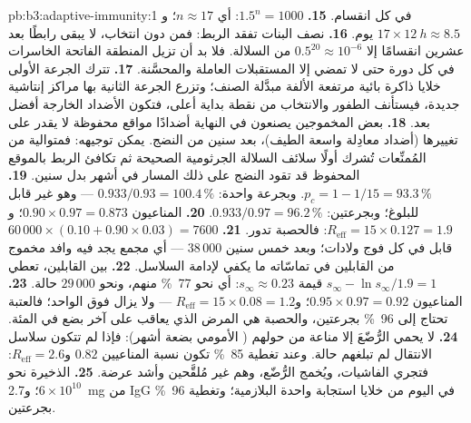 \begin{solution}{pb:b3:adaptive-immunity:1}
في كل انقسام.
\textbf{15.} $1.5^{n} = 1000$: أي $n \approx 17$؛ و$17\times \qty{12}{h}
\approx 8.5$ يوم.
\textbf{16.} نصف البنات تفقد الربط: فمن دون انتخاب، لا يبقى
رابطًا بعد عشرين انقسامًا إلا $0.5^{20}
\approx 10^{-6}$ من السلالة. فلا بد أن تزيل المنطقة الفاتحة
الخاسرات في كل دورة حتى لا تمضي إلا المستقبلات العاملة
والمحسَّنة.
\textbf{17.} تترك الجرعة الأولى خلايا ذاكرة بائية مرتفعة
الألفة مبدَّلة الصنف؛ وتزرع الجرعة الثانية بها مراكز
إنتاشية جديدة، فيستأنف الطفور والانتخاب من نقطة بداية أعلى،
فتكون الأضداد الخارجة أفضل بعد.
\textbf{18.} بعض المخموجين يصنعون في النهاية أضدادًا  مواقع
محفوظة لا يقدر  على تغييرها (أضداد معادِلة واسعة
الطيف)، بعد سنين من النضج.  يمكن توجيهه:
فمتوالية من المُمنِّعات تُشرك أولًا سلائف السلالة الجرثومية
الصحيحة ثم تكافئ الربط بالموقع المحفوظ قد تقود النضج على
ذلك المسار في أشهر بدل سنين.
\textbf{19.} $p_{c} = 1 - 1/15 = 93.3\,\%$. وبجرعة واحدة: $0.933/0.93 =
100.4\,\%$ --- وهو غير قابل للبلوغ؛ وبجرعتين: $0.933/0.97 = 96.2\,\%$.
\textbf{20.} المناعيون $0.90\times 0.97 = 0.873$؛ و$R_{\text{eff}} = 15\times
0.127 = 1.9$: فالحصبة تدور.
\textbf{21.} $60\,000\times (0.10 + 0.90\times 0.03) = 7600$ قابل في كل
فوج ولادات؛ وبعد خمس سنين $38\,000$ --- أي مجمع يجد فيه
وافد مخموج من القابلين في تماسّاته ما يكفي لإدامة السلاسل.
\textbf{22.} بين القابلين، تعطي $s_{\infty} - \ln s_{\infty}/1.9 =
1$ قيمة $s_{\infty} \approx 0.23$: أي نحو \qty{77}{\%} منهم، ونحو
$29\,000$ حالة.
\textbf{23.} المناعيون $0.95\times 0.97 = 0.92$؛ و$R_{\text{eff}} = 15\times
0.08 = 1.2$ --- ولا يزال فوق الواحد؛ فالعتبة تحتاج إلى
\qty{96}{\%} بجرعتين، والحصبة هي المرض الذي يعاقب على آخر بضع
في المئة.
\textbf{24.} لا يحمي الرُّضّعَ إلا مناعة من حولهم (
الأمومي بضعة أشهر): فإذا لم تتكون سلاسل الانتقال لم تبلغهم
حالة. وعند تغطية \qty{85}{\%} تكون نسبة المناعيين $0.82$
و$R_{\text{eff}} = 2.6$: فتجري الفاشيات، ويُخمج الرُّضّع، وهم
غير مُلقَّحين وأشد عرضة.
\textbf{25.} الذخيرة نحو $6\times 10^{10}$؛ و\qty{2.7}{mg} من IgG في
اليوم من خلايا استجابة واحدة البلازمية؛ وتغطية \qty{96}{\%}
بجرعتين.
\end{solution}
